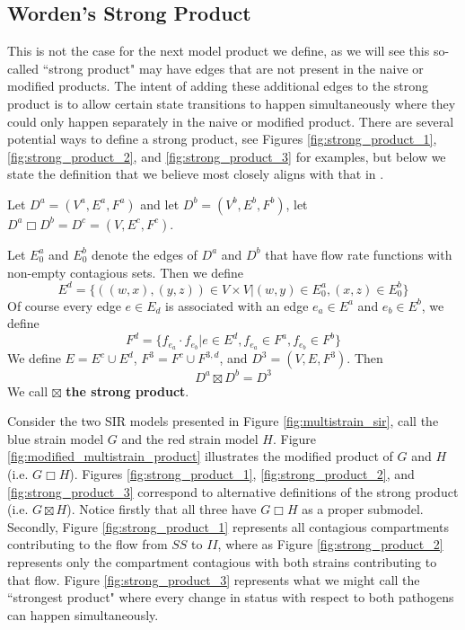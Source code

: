 \begin{appendices}

\section{Worden's Strong Product}\label{secA1}

This is not the case for the next model product we define, as we will see this so-called “strong product" may have edges that are not present in the naive or modified products. The intent of adding these additional edges to the strong product is to allow certain state transitions to happen simultaneously where they could only happen separately in the naive or modified product. There are several potential ways to define a strong product, see Figures \ref{fig:strong_product_1}, \ref{fig:strong_product_2}, and \ref{fig:strong_product_3} for examples, but below we state the definition that we believe most closely aligns with that in \cite{worden2017products}.

\begin{definition}
     Let $D^a = (V^a, E^a, F^a)$ and let $D^b = (V^b, E^b, F^b)$, let $D^a\Box D^b = D^c = (V, E^c, F^c)$. 
     
     Let $E^a_0$ and $E^b_0$ denote the edges of $D^a$ and $D^b$ that have flow rate functions with non-empty contagious sets. Then we define
     \begin{equation}
        E^d = \{((w, x), (y, z))\in V\times V\vert (w, y)\in E^a_0, (x,z)\in E^b_0\}
     \end{equation}
     Of course every edge $e\in E_d$ is associated with an edge $e_a\in E^a$ and $e_b\in E^b$, we define
     \begin{equation}
        F^d = \{ f_{e_a}\cdot f_{e_b} \vert e\in E^d, f_{e_a}\in F^a, f_{e_b}\in F^b  \}
     \end{equation}
     We define $E=E^c\cup E^d$, $F^3=F^{c}\cup F^{3,d}$, and $D^3=(V, E, F^3)$. Then
     \begin{equation}
        D^a\boxtimes D^b = D^3
     \end{equation} We call $\boxtimes$ \textbf{the strong product}.
\end{definition}


Consider the two SIR models presented in Figure \ref{fig:multistrain_sir}, call the blue strain model $G$ and the red strain model $H$. Figure \ref{fig:modified_multistrain_product} illustrates the modified product of $G$ and $H$ (i.e. $G\Box H$). Figures \ref{fig:strong_product_1}, \ref{fig:strong_product_2}, and \ref{fig:strong_product_3} correspond to alternative definitions of the strong product (i.e. $G\boxtimes H$). Notice firstly that all three have $G\Box H$ as a proper submodel. Secondly, Figure \ref{fig:strong_product_1} represents all contagious compartments contributing to the flow from $SS$ to $II$, where as Figure \ref{fig:strong_product_2} represents only the compartment contagious with both strains contributing to that flow. Figure \ref{fig:strong_product_3} represents what we might call the “strongest product" where every change in status with respect to both pathogens can happen simultaneously.



\end{appendices}
